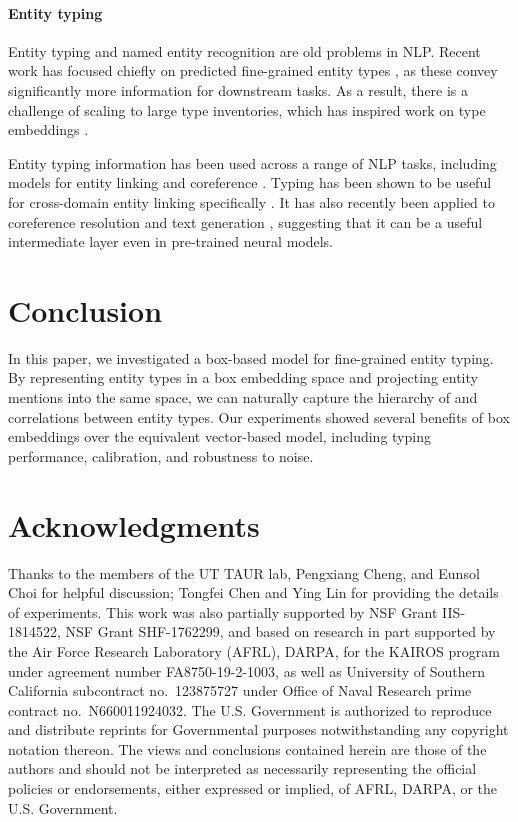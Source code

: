 \documentclass[11pt,a4paper]{article}
\begin{document}
\paragraph{Entity typing} Entity typing and named entity recognition \cite{conll_03} are old problems in NLP. Recent work has focused chiefly on predicted fine-grained entity types \cite{Xiao_Ling_12,Dan_Gillick_14,Eunsol_Choi_18}, as these convey significantly more information for downstream tasks. As a result, there is a challenge of scaling to large type inventories, which has inspired work on type embeddings \cite{Xiang_Ren_16a, Xiang_Ren_16b}.

Entity typing information has been used across a range of NLP tasks, including models for entity linking and coreference \citep{Durrett_Klein_14}. Typing has been shown to be useful for cross-domain entity linking specifically \citep{Nitish_Gupta_17,Yasumasa_Onoe_20}. It has also recently been applied to coreference resolution \cite{Yasumasa_Onoe_20_Findings,Khosla_Rose_2020_Type} and text generation \cite{Dong_2020_Injecting}, suggesting that it can be a useful intermediate layer even in pre-trained neural models.


\section{Conclusion}\label{conclusion}

In this paper, we investigated a box-based model for fine-grained entity typing. By representing entity types in a box embedding space and projecting entity mentions into the same space, we can naturally capture the hierarchy of and correlations between entity types. Our experiments showed several benefits of box embeddings over the equivalent vector-based model, including typing performance, calibration, and robustness to noise.

\section*{Acknowledgments}

Thanks to the members of the UT TAUR lab, Pengxiang Cheng, and Eunsol Choi for helpful discussion; Tongfei Chen and Ying Lin for providing the details of experiments.
This work was also partially supported by NSF Grant IIS-1814522, NSF Grant SHF-1762299, and based on research in part supported by the Air Force Research Laboratory (AFRL), DARPA, for the KAIROS program under agreement number FA8750-19-2-1003, as well as
University of Southern California subcontract no.~123875727 under Office of Naval Research prime contract no.~N660011924032.
The U.S. Government is authorized to reproduce and distribute reprints for Governmental purposes notwithstanding any copyright notation thereon. The views and conclusions contained herein are those of the authors and should not be interpreted as necessarily representing the official policies or endorsements, either expressed or implied, of AFRL, DARPA, or the U.S. Government.
\end{document}
